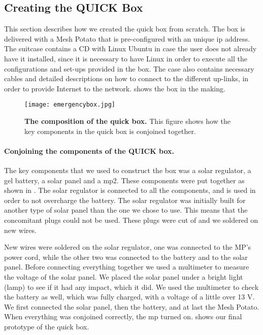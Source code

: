 \clearpage

\subsection{Creating the QUICK Box}
This section describes how we created the \gls{quick} box from scratch. The box is delivered with a Mesh Potato that is pre-configured with an unique \gls{ip} address. The suitcase contains a CD with Linux Ubuntu in case the user does not already have it installed, since it is necessary to have Linux in order to execute all the configurations and set-ups provided in the box. The case also contains necessary cables and detailed descriptions on how to connect to the different up-links, in order to provide Internet to the network.  shows the box in the making.


\begin{figure}[b]
  \centering
      \texttt{[image: emergencybox.jpg]}
  \caption [The composition of the \gls{quick} box]{\textbf{The composition of the \gls{quick} box.} This figure shows how the key components in the \gls{quick} box is conjoined together.}
  \label{fig:emergencybox}
\end{figure}

\paragraph{Conjoining the components of the QUICK box.}
The key components that we used to construct the box was a solar regulator, a gel battery, a solar panel and a \gls{mp2}. These components were put together as shown in . The solar regulator is connected to all the components, and is used in order to not overcharge the battery. The solar regulator was initially built for another type of solar panel than the one we chose to use. This means that the concomitant plugs could not be used. These plugs were cut of and we soldered on new wires.  

New wires were soldered on the solar regulator, one was connected to the MP's power cord, while the other two was connected to the battery and to the solar panel. Before connecting everything together we used a multimeter to measure the voltage of the solar panel. We placed the solar panel under a bright light (lamp) to see if it had any impact, which it did. We used the multimeter to check the battery as well, which was fully charged, with a voltage of a little over 13 V. 
We first connected the solar panel, then the battery, and at last the Mesh Potato. When everything was conjoined correctly, the \gls{mp} turned on.  shows our final prototype of the \gls{quick} box. 

